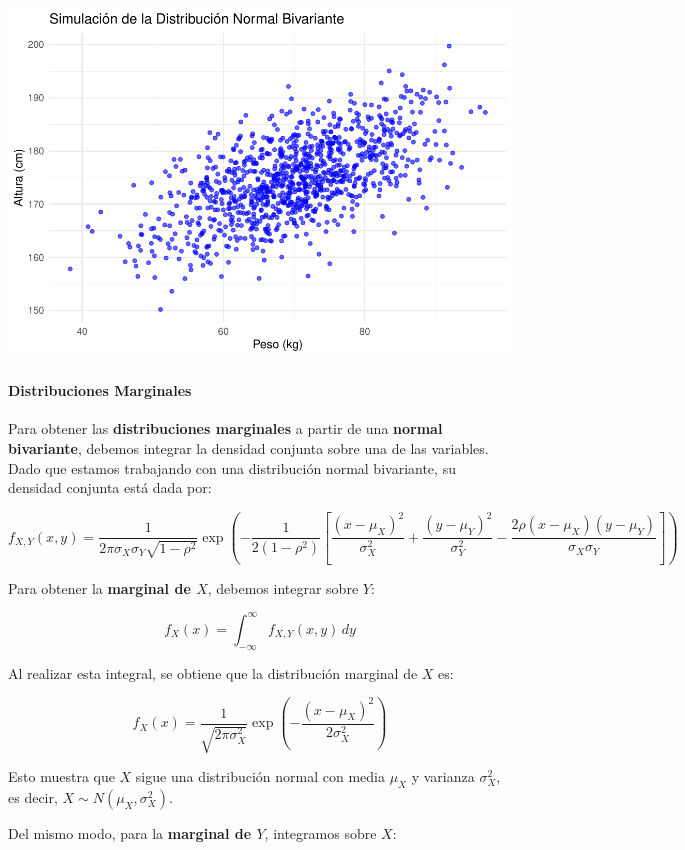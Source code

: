\documentclass[
]{article}
\begin{document}
\includegraphics{_main_files/figure-latex/unnamed-chunk-11-1.pdf}

\paragraph{Distribuciones Marginales}\label{distribuciones-marginales-1}

Para obtener las \textbf{distribuciones marginales} a partir de una \textbf{normal bivariante}, debemos integrar la densidad conjunta sobre una de las variables. Dado que estamos trabajando con una distribución normal bivariante, su densidad conjunta está dada por:

\[
f_{X,Y}(x, y) = \frac{1}{2 \pi \sigma_X \sigma_Y \sqrt{1 - \rho^2}} \exp\left( -\frac{1}{2(1 - \rho^2)} \left[ \frac{(x - \mu_X)^2}{\sigma_X^2} + \frac{(y - \mu_Y)^2}{\sigma_Y^2} - \frac{2\rho(x - \mu_X)(y - \mu_Y)}{\sigma_X \sigma_Y} \right] \right)
\]

Para obtener la \textbf{marginal de \(X\)}, debemos integrar sobre \(Y\):

\[
f_X(x) = \int_{-\infty}^{\infty} f_{X,Y}(x, y) \, dy
\]

Al realizar esta integral, se obtiene que la distribución marginal de \(X\) es:

\[
f_X(x) = \frac{1}{\sqrt{2 \pi \sigma_X^2}} \exp\left( -\frac{(x - \mu_X)^2}{2 \sigma_X^2} \right)
\]

Esto muestra que \(X\) sigue una distribución normal con media \(\mu_X\) y varianza \(\sigma_X^2\), es decir, \(X \sim N(\mu_X, \sigma_X^2)\).

Del mismo modo, para la \textbf{marginal de \(Y\)}, integramos sobre \(X\):
\end{document}
